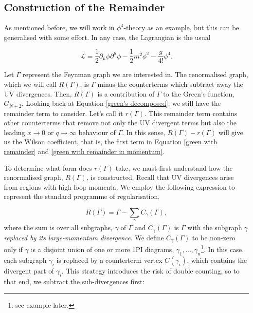 \documentclass{article}
\begin{document}
\subsection{Construction of the Remainder}

As mentioned before, we will work in $\phi^4$-theory as an example, but this can be generalised with  some effort. In any case, the Lagrangian is the usual

\begin{equation}
    \mathcal{L}= \frac{1}{2}\partial_\mu\phi\partial^\mu\phi - \frac{1}{2}m^2\phi^2 - \frac{g}{4!}\phi^4.
\end{equation}

Let $\Gamma$ represent the Feynman graph we are interested in. The renormalised graph, which we will call $R(\Gamma)$, is $\Gamma$ minus the counterterms which subtract away the UV divergences. Then, $R(\Gamma)$ is a contribution of $\Gamma$ to the Green's function, $G_{N+2}$. Looking back at Equation \ref{green's decomposed}, we still have the remainder term to consider. Let's call it $r(\Gamma)$. This remainder term contains other counterterms that remove not only the UV divergent terms but also the leading $x\rightarrow 0$ or $q \rightarrow \infty$ behaviour of $\Gamma$. In this sense, $R(\Gamma) - r(\Gamma)$ will give us the Wilson coefficient, that is, the first term in Equation \ref{green with remainder} and \ref{green with remainder in momentum}.

To determine what form does $r(\Gamma)$ take, we must first understand how the renormalised graph, $R(\Gamma)$, is constructed. Recall that UV divergences arise from regions with high loop momenta. We employ the following expression to represent the standard programme of regularisation,

\begin{equation}
    R(\Gamma) = \Gamma - \sum_\gamma C_\gamma(\Gamma),
\end{equation}
where the sum is over all subgraphs, $\gamma$ of $\Gamma$ and $C_\gamma(\Gamma)$ is $\Gamma$ with the subgraph $\gamma$ \textit{replaced by its large-momentum divergence}. We define $C_\gamma(\Gamma)$ to be non-zero only if $\gamma$ is a disjoint union of one or more 1PI diagrams, $\gamma_1,\dots,\gamma_n$\footnote{see example later.}. In this case, each subgraph $\gamma_i$ is replaced by a counterterm vertex $C(\gamma_i)$, which contains the divergent part of $\gamma_i$. This strategy introduces the risk of double counting, so to that end, we subtract the sub-divergences first:
\end{document}
